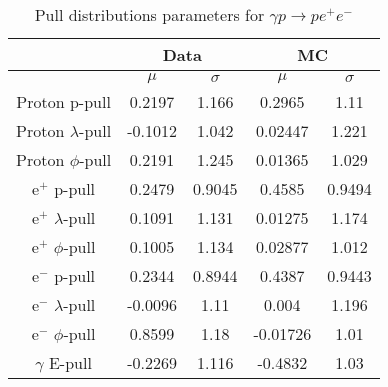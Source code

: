 \begin{table}[h!]
\begin{center}
\caption[Pull distributions parameters for $\gamma p \to p e^+e^-$]{\label{tab:Pulllepspecs}Pull distributions parameters for $\gamma p \to p e^+e^-$ \vspace{0.75mm}}

\begin{tabular}{c|c|c||c|c}
\hline
&\multicolumn{2}{c||}{Data} &\multicolumn{2}{c}{MC} \\
\hline
&$\mu$   &$\sigma$ &$\mu$   &$\sigma$\\
\hline
Proton p-pull                            & 0.2197 & 1.166 & 0.2965 & 1.11\\
\hline
Proton $\lambda$-pull                      & -0.1012 & 1.042 & 0.02447 & 1.221  \\
\hline
Proton $\phi$-pull                         & 0.2191 & 1.245 & 0.01365 & 1.029 \\
\hline
$\mathrm{e}^{+}$ p-pull        & 0.2479  & 0.9045 & 0.4585 & 0.9494\\
\hline
$\mathrm{e}^{+}$ $\lambda$-pull & 0.1091  & 1.131 & 0.01275 & 1.174 \\
\hline
$\mathrm{e}^{+}$ $\phi$-pull    & 0.1005 & 1.134 & 0.02877 & 1.012 \\
\hline
$\mathrm{e}^{-}$ p-pull        & 0.2344  & 0.8944 & 0.4387 & 0.9443 \\
\hline
$\mathrm{e}^{-}$ $\lambda$-pull & -0.0096  & 1.11  & 0.004 & 1.196 \\
\hline
$\mathrm{e}^{-}$ $\phi$-pull    & 0.8599 & 1.18 & -0.01726 & 1.01\\
\hline
$\gamma$ E-pull   & -0.2269 & 1.116 & -0.4832 & 1.03 \\
\hline \hline
\end{tabular}
\end{center}
\end{table}